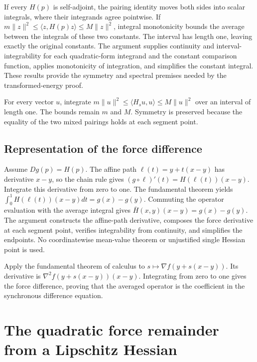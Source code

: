 \documentclass[11pt,a4paper]{report}
\begin{document}
If every \(H(p)\) is self-adjoint, the pairing identity moves both sides into scalar integrals, where their integrands agree pointwise. If \(m\|z\|^2\le\langle z,H(p)z\rangle\le M\|z\|^2\), integral monotonicity bounds the average between the integrals of these two constants. The interval has length one, leaving exactly the original constants. The argument supplies continuity and interval-integrability for each quadratic-form integrand and the constant comparison function, applies monotonicity of integration, and simplifies the constant integral. These results provide the symmetry and spectral premises needed by the transformed-energy proof.



For every vector \(u\), integrate \(m\|u\|^2\le\langle H_su,u\rangle\le M\|u\|^2\) over an interval of length one. The bounds remain \(m\) and \(M\). Symmetry is preserved because the equality of the two mixed pairings holds at each segment point.

\subsection{\texorpdfstring{Representation of the force difference}{Representation of the force difference}}
\label{report-step-KineticLangevin-Hessian-lean-3}


Assume \(Dg(p)=H(p)\). The affine path \(\ell(t)=y+t(x-y)\) has derivative \(x-y\), so the chain rule gives \((g\circ\ell)'(t)=H(\ell(t))(x-y)\). Integrate this derivative from zero to one. The fundamental theorem yields \(\int_0^1H(\ell(t))(x-y)dt=g(x)-g(y)\). Commuting the operator evaluation with the average integral gives \(\bar H(x,y)(x-y)=g(x)-g(y)\). The argument constructs the affine-path derivative, composes the force derivative at each segment point, verifies integrability from continuity, and simplifies the endpoints. No coordinatewise mean-value theorem or unjustified single Hessian point is used.



Apply the fundamental theorem of calculus to \(s\mapsto\nabla f(y+s(x-y))\). Its derivative is \(\nabla^2f(y+s(x-y))(x-y)\). Integrating from zero to one gives the force difference, proving that the averaged operator is the coefficient in the synchronous difference equation.

\section{\texorpdfstring{The quadratic force remainder from a Lipschitz Hessian}{The quadratic force remainder from a Lipschitz Hessian}}
\label{proof-module-KineticLangevin-HessianRemainder-lean}
\end{document}

